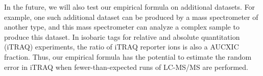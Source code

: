 In the future, we will also test our empirical formula on additional datasets.
For example, one such additional dataset can be produced by a mass spectrometer of another type,
	and this mass spectrometer can analyze a complex sample to produce this dataset.	
In isobaric tags for relative and absolute quantitation (iTRAQ) experiments,	
	the ratio of iTRAQ reporter ions is also a \gls{AUCXIC} fraction.
Thus, our empirical formula has the potential to estimate the random error in iTRAQ when fewer-than-expected runs of \gls{LC-MS/MS} are performed.
